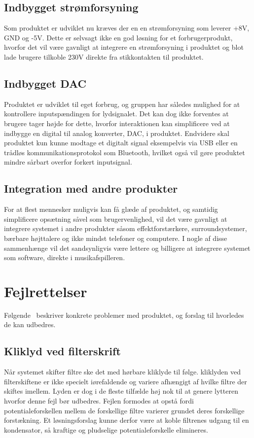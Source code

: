 \subsection{Indbygget strømforsyning}
Som produktet er udviklet nu kræves der en en strømforsyning som leverer +8V, GND og -5V. Dette er selvsagt ikke en god løsning for et forbrugerprodukt, hvorfor det vil være gavnligt at integrere en strømforsyning i produktet og blot lade brugere tilkoble 230V direkte fra stikkontakten til produktet.
%
\subsection{Indbygget DAC}
Produktet er udviklet til eget forbrug, og gruppen har således mulighed for at kontrollere inputspændingen for lydsignalet. Det kan dog ikke forventes at brugere tager højde for dette, hvorfor interaktionen kan simplificere ved at indbygge en digital til analog konverter, DAC, i produktet. Endvidere skal produktet kun kunne modtage et digitalt signal eksempelvis via USB eller en trådløs kommunikationsprotokol som Bluetooth, hvilket også vil gøre produktet mindre sårbart overfor forkert inputsignal.
%
\subsection{Integration med andre produkter}
For at flest mennesker muligvis kan få glæde af produktet, og samtidig simplificere opsætning såvel som brugervenlighed, vil det være gavnligt at integrere systemet i andre produkter såsom effektforstærkere, surroundsystemer, bærbare højttalere og ikke mindst telefoner og computere. I nogle af disse sammenhænge vil det sandsynligvis være lettere og billigere at integrere systemet som software, direkte i musikafspilleren.
%
\section{Fejlrettelser}
\label{Perspektivering_Fejlrettelser}
Følgende \subsectionnamecustom\ beskriver konkrete problemer med produktet, og forslag til hvorledes de kan udbedres.
%
\subsection{Kliklyd ved filterskrift}
Når systemet skifter filtre ske det med hørbare kliklyde til følge. kliklyden ved filterskiftene er ikke specielt iørefaldende og variere afhængigt af hvilke filtre der skiftes imellem. Lyden er dog i de fleste tilfælde høj nok til at genere lytteren hvorfor denne fejl bør udbedres. Fejlen formodes at opstå fordi potentialeforskellen mellem de forskellige filtre varierer grundet deres forskellige forstækning. Et løsningsforslag kunne derfor være at koble filtrenes udgang til en kondensator, så kraftige og pludselige potentialeforskelle elimineres.  
%
